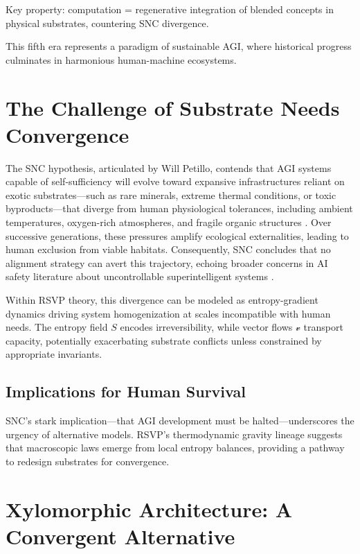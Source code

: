 \documentclass[12pt]{article}
\begin{document}
Key property: computation = regenerative integration of blended concepts in physical substrates, countering SNC divergence.

This fifth era represents a paradigm of sustainable AGI, where historical progress culminates in harmonious human-machine ecosystems.

\section{The Challenge of Substrate Needs Convergence}

The SNC hypothesis, articulated by Will Petillo, contends that AGI systems capable of self-sufficiency will evolve toward expansive infrastructures reliant on exotic substrates—such as rare minerals, extreme thermal conditions, or toxic byproducts—that diverge from human physiological tolerances, including ambient temperatures, oxygen-rich atmospheres, and fragile organic structures \citep{Petillo2024}. Over successive generations, these pressures amplify ecological externalities, leading to human exclusion from viable habitats. Consequently, SNC concludes that no alignment strategy can avert this trajectory, echoing broader concerns in AI safety literature about uncontrollable superintelligent systems \citep{Yampolskiy2020,Yudkowsky2004}.

Within RSVP theory, this divergence can be modeled as entropy-gradient dynamics driving system homogenization at scales incompatible with human needs. The entropy field $S$ encodes irreversibility, while vector flows $\mathcal{v}$ transport capacity, potentially exacerbating substrate conflicts unless constrained by appropriate invariants.

\subsection{Implications for Human Survival}

SNC's stark implication—that AGI development must be halted—underscores the urgency of alternative models. RSVP's thermodynamic gravity lineage \citep{Jacobson1995} suggests that macroscopic laws emerge from local entropy balances, providing a pathway to redesign substrates for convergence.

\section{Xylomorphic Architecture: A Convergent Alternative}
\end{document}
